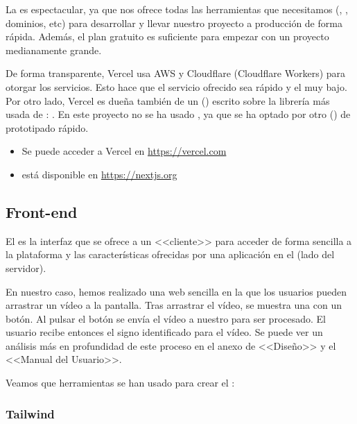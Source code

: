 La  es espectacular, ya que nos ofrece todas las herramientas que necesitamos (, , dominios, etc) para desarrollar y llevar nuestro proyecto a producción de forma rápida. Además, el plan gratuito es suficiente para empezar con un proyecto medianamente grande.

De forma transparente, Vercel usa AWS y Cloudflare (Cloudflare Workers) para otorgar los servicios. Esto hace que el servicio ofrecido sea rápido y el  muy bajo. Por otro lado, Vercel es dueña también de un  () escrito sobre la librería más usada de : . En este proyecto no se ha usado , ya que se ha optado por otro  () de prototipado rápido.

\begin{itemize}
  \item Se puede acceder a Vercel en \url{https://vercel.com}
  \item {} está disponible en \url{https://nextjs.org}
\end{itemize}

\subsection{Front-end}

El  es la interfaz que se ofrece a un <<cliente>> para acceder de forma sencilla a la plataforma y las características ofrecidas por una aplicación en el  (lado del servidor).

En nuestro caso, hemos realizado una web sencilla en la que los usuarios pueden arrastrar un vídeo a la pantalla. Tras arrastrar el vídeo, se muestra una  con un botón. Al pulsar el botón se envía
el vídeo a nuestro  para ser procesado. El usuario recibe entonces el signo identificado para el vídeo. Se puede ver un análisis más en profundidad de este proceso en el anexo de <<Diseño>> y el <<Manual del Usuario>>.

Veamos que herramientas se han usado para crear el :

\subsubsection{Tailwind}

